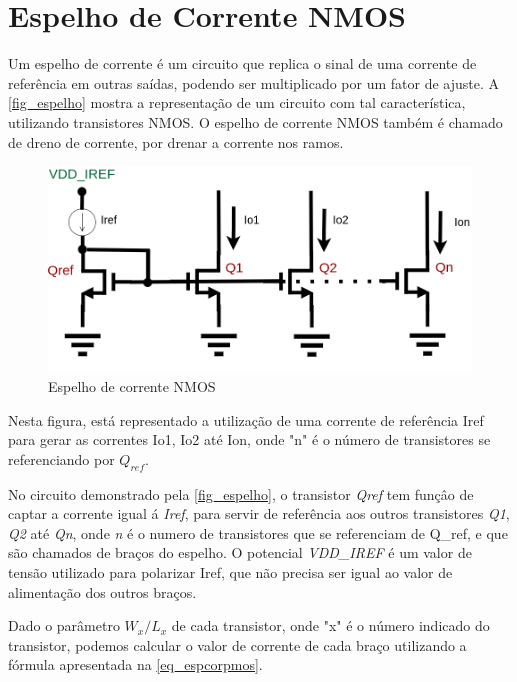\label{anexoespelhos}

\section{Espelho de Corrente NMOS}

Um espelho de corrente \'e um circuito que replica o sinal de uma corrente de refer\^encia em outras sa\'idas, podendo ser multiplicado por um fator de ajuste. A \autoref{fig_espelho} mostra a representa{\c c}\~ao de um circuito com tal caracter\'istica, utilizando transistores NMOS. O espelho de corrente NMOS tamb\'em \'e chamado de dreno de corrente, por drenar a corrente nos ramos.

\begin{figure}[htb]
    \label{fig_espelho}
    \centering
    \caption{Espelho de corrente NMOS} 
    \includegraphics[scale=0.4]{Circuitos/current_mirror_example.png}
\end{figure}

Nesta figura, est\'a representado a utiliza{\c c}\~ao de uma corrente de refer\^encia Iref para gerar as correntes Io1, Io2 at\'e Ion, onde "n" \'e o n\'umero de transistores se referenciando por $Q_{ref}$.

No circuito demonstrado pela \autoref{fig_espelho}, o transistor \emph{Qref} tem funç\^ao de captar a corrente igual \'a \emph{Iref}, para servir de refer\^encia aos outros transistores \emph{Q1}, \emph{Q2} at\'e \emph{Qn}, onde \emph{n} \'e o numero de transistores que se referenciam de Q\_ref, e que s\~ao chamados de bra{\c c}os do espelho. O potencial \emph{VDD\_IREF} \'e um valor de tens\~ao utilizado para polarizar Iref, que n\~ao precisa ser igual ao valor de alimenta{\c c}\~ao dos outros bra{\c c}os.

Dado o parâmetro $W_x/L_x$ de cada transistor, onde "x" é o número indicado do transistor, podemos calcular o valor de corrente de cada braço utilizando a fórmula apresentada na \autoref{eq_espcorpmos}.

